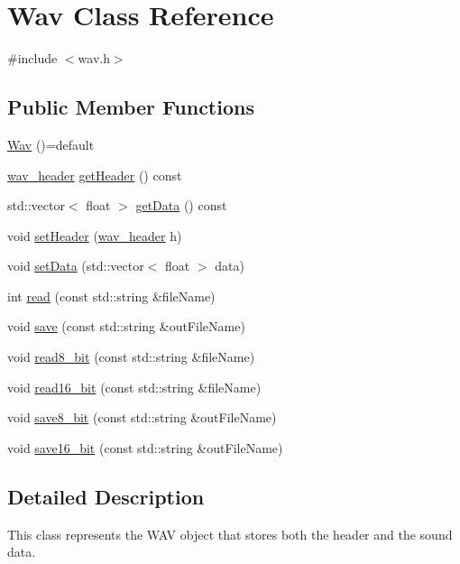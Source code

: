 \hypertarget{classWav}{}\section{Wav Class Reference}
\label{classWav}


{\ttfamily \#include $<$wav.\+h$>$}

\subsection*{Public Member Functions}
\begin{DoxyCompactItemize}
\item 
\hyperlink{classWav_a23e1700f87bc1b794819be1f819b7272}{Wav} ()=default
\item 
\hyperlink{structwav__header}{wav\+\_\+header} \hyperlink{classWav_a0e3b4a459b2a947b6513f97023fd1e26}{get\+Header} () const
\item 
std\+::vector$<$ float $>$ \hyperlink{classWav_a253ddb3b27bc08e7bc9e3b3fc027341d}{get\+Data} () const
\item 
void \hyperlink{classWav_acff4451463630b5ddb1a31e43cbab95e}{set\+Header} (\hyperlink{structwav__header}{wav\+\_\+header} h)
\item 
void \hyperlink{classWav_a7e0568b73367b2ea5033b6b1339e4102}{set\+Data} (std\+::vector$<$ float $>$ data)
\item 
int \hyperlink{classWav_ab041ca7da4c04d795aa5286a920fb08a}{read} (const std\+::string \&file\+Name)
\item 
void \hyperlink{classWav_a91ed648e0578a907df2f3363d069a4bd}{save} (const std\+::string \&out\+File\+Name)
\item 
void \hyperlink{classWav_aae25e05765875439d7817d1e4faf15cd}{read8\+\_\+bit} (const std\+::string \&file\+Name)
\item 
void \hyperlink{classWav_a6c081bff6b89f578ed1d5529536c8324}{read16\+\_\+bit} (const std\+::string \&file\+Name)
\item 
void \hyperlink{classWav_a66847ec05647a0d091c23b789d2838e1}{save8\+\_\+bit} (const std\+::string \&out\+File\+Name)
\item 
void \hyperlink{classWav_a5ebabfc8d61edabf31787fbcf2f7f8ad}{save16\+\_\+bit} (const std\+::string \&out\+File\+Name)
\end{DoxyCompactItemize}


\subsection{Detailed Description}
This class represents the W\+AV object that stores both the header and the sound data. 

